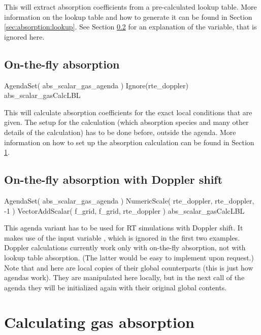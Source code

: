 This will extract absorption coefficients from a pre-calculated lookup
table.  More information on the lookup table and how to generate it
can be found in Section \ref{sec:absorption:lookup}.  See Section
\ref{sec:absorption:doppler} for an explanation of the
 variable, that is ignored here.
 
\subsection{On-the-fly absorption}

\begin{code}
AgendaSet( abs_scalar_gas_agenda )
{
  Ignore(rte_doppler)
  abs_scalar_gasCalcLBL
}
\end{code}

This will calculate absorption coefficients for the exact local
conditions that are given.  The setup for the calculation (which
absorption species and many other details of the calculation) has to
be done before, outside the agenda.  More information on how to set up
the absorption calculation can be found in Section
\ref{sec:absorption:calculating}.  

\subsection{On-the-fly absorption with Doppler shift}
\label{sec:absorption:doppler}

\begin{code}
AgendaSet( abs_scalar_gas_agenda )
{
  NumericScale( rte_doppler, rte_doppler, -1 )
  VectorAddScalar( f_grid, f_grid, rte_doppler )
  abs_scalar_gasCalcLBL
}
\end{code}

This agenda variant has to be used for RT simulations with Doppler
shift.  It makes use of the input variable ,
which is ignored in the first two examples.  Doppler calculations
currently work only with on-the-fly absorption, not with lookup table
absorption. (The latter would be easy to implement upon request.) Note
that  and  here are local
copies of their global counterparts (this is just how agendas
work). They are manipulated here locally, but in the next call of the
agenda they will be initialized again with their original global
contents. 

\section{Calculating gas absorption}
\label{sec:absorption:calculating}

